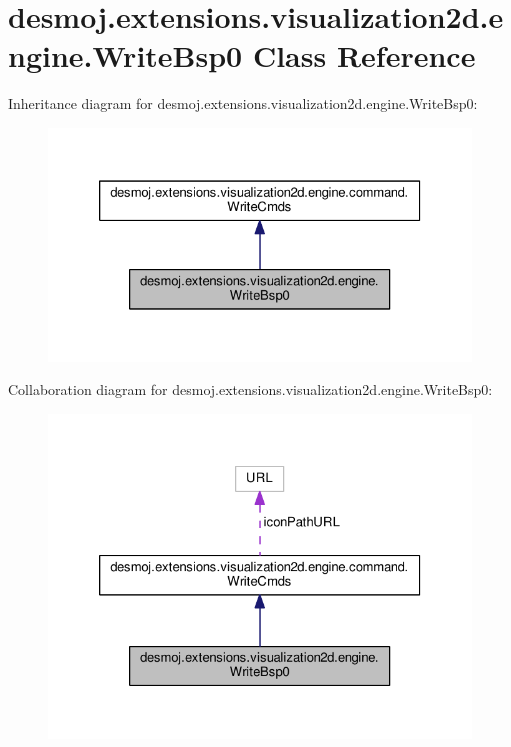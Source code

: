 \section{desmoj.\-extensions.\-visualization2d.\-engine.\-Write\-Bsp0 Class Reference}
\label{classdesmoj_1_1extensions_1_1visualization2d_1_1engine_1_1_write_bsp0}


Inheritance diagram for desmoj.\-extensions.\-visualization2d.\-engine.\-Write\-Bsp0\-:
\nopagebreak
\begin{figure}[H]
\begin{center}
\leavevmode
\includegraphics[width=326pt]{classdesmoj_1_1extensions_1_1visualization2d_1_1engine_1_1_write_bsp0__inherit__graph}
\end{center}
\end{figure}


Collaboration diagram for desmoj.\-extensions.\-visualization2d.\-engine.\-Write\-Bsp0\-:
\nopagebreak
\begin{figure}[H]
\begin{center}
\leavevmode
\includegraphics[width=326pt]{classdesmoj_1_1extensions_1_1visualization2d_1_1engine_1_1_write_bsp0__coll__graph}
\end{center}
\end{figure}

